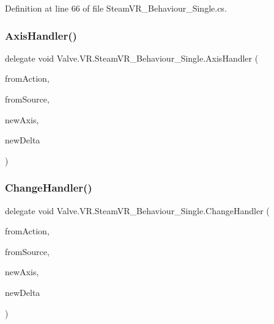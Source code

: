 Definition at line 66 of file Steam\+V\+R\+\_\+\+Behaviour\+\_\+\+Single.\+cs.

\mbox{\label{class_valve_1_1_v_r_1_1_steam_v_r___behaviour___single_ae61cad9d74c4df6b8efd9ead49b15ea9}} 
\subsubsection{\texorpdfstring{AxisHandler()}{AxisHandler()}}
{\footnotesize\ttfamily delegate void Valve.\+V\+R.\+Steam\+V\+R\+\_\+\+Behaviour\+\_\+\+Single.\+Axis\+Handler (\begin{DoxyParamCaption}\item[{\mbox{\hyperlink{class_valve_1_1_v_r_1_1_steam_v_r___behaviour___single}{Steam\+V\+R\+\_\+\+Behaviour\+\_\+\+Single}}}]{from\+Action,  }\item[{\mbox{\hyperlink{namespace_valve_1_1_v_r_a82e5bf501cc3aa155444ee3f0662853f}{Steam\+V\+R\+\_\+\+Input\+\_\+\+Sources}}}]{from\+Source,  }\item[{float}]{new\+Axis,  }\item[{float}]{new\+Delta }\end{DoxyParamCaption})}

\mbox{\label{class_valve_1_1_v_r_1_1_steam_v_r___behaviour___single_aa4d7e1b4579edc552044b04551e0e490}} 
\subsubsection{\texorpdfstring{ChangeHandler()}{ChangeHandler()}}
{\footnotesize\ttfamily delegate void Valve.\+V\+R.\+Steam\+V\+R\+\_\+\+Behaviour\+\_\+\+Single.\+Change\+Handler (\begin{DoxyParamCaption}\item[{\mbox{\hyperlink{class_valve_1_1_v_r_1_1_steam_v_r___behaviour___single}{Steam\+V\+R\+\_\+\+Behaviour\+\_\+\+Single}}}]{from\+Action,  }\item[{\mbox{\hyperlink{namespace_valve_1_1_v_r_a82e5bf501cc3aa155444ee3f0662853f}{Steam\+V\+R\+\_\+\+Input\+\_\+\+Sources}}}]{from\+Source,  }\item[{float}]{new\+Axis,  }\item[{float}]{new\+Delta }\end{DoxyParamCaption})}


